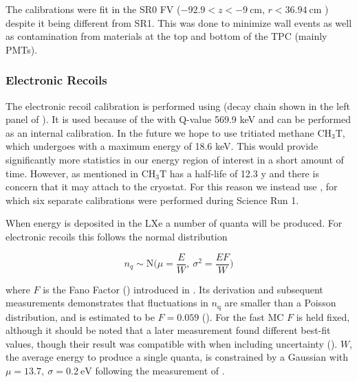The calibrations were fit in the SR0 FV ($-92.9 < z < -9\ \mathrm{cm}$, $r < 36.94\ \mathrm{cm}$
) despite it being different from SR1.  This was done to minimize wall events as well as
contamination from materials at the top and bottom of the TPC (mainly PMTs).



\subsubsection{Electronic Recoils}
\label{subsubsec:er_nr_calibrations_parameter_determ_er}
The electronic recoil calibration is performed using  (decay chain shown in the left panel of
).  It is used because of the  \betadecay with Q-value 569.9 keV and can be performed
as an internal calibration.  In the future we hope to use tritiated methane $\mathrm{C H_3 T}$, which undergoes \betadecay
with a maximum energy of 18.6 keV.  This would provide significantly more statistics in our energy region of interest in a short amount
of time.  However, as mentioned in  $\mathrm{C H_3 T}$ has a half-life of 12.3 y and there
is concern that it may attach to the cryostat.  For this reason we instead use , for which six separate calibrations were
performed during Science Run 1.

When energy is deposited in the LXe a number of quanta will be produced.  For electronic recoils this follows the normal distribution

\begin{equation}
n_q \sim \mathrm{N} \bigg( \mu = \frac{E}{W},\ \sigma^2 = \frac{E F}{W} \bigg)
\label{eq:er_nr_calibrations_parameter_determ_er_quanta}
\end{equation}

\noindent where $F$ is the Fano Factor () introduced in .  Its derivation and subsequent measurements
demonstrates
that fluctuations in $n_{\mathrm{q}}$ are smaller than a Poisson distribution, and is estimated to be $F = 0.059$ ().  For the
fast MC $F$ is held fixed, although it should be noted that a later measurement found different best-fit values, though their result was
compatible with  when including uncertainty ().  $W$, the average energy to produce a single
quanta, is constrained by a Gaussian with $\mu = 13.7,\ \sigma = 0.2\ \mathrm{eV}$ following the measurement of .

